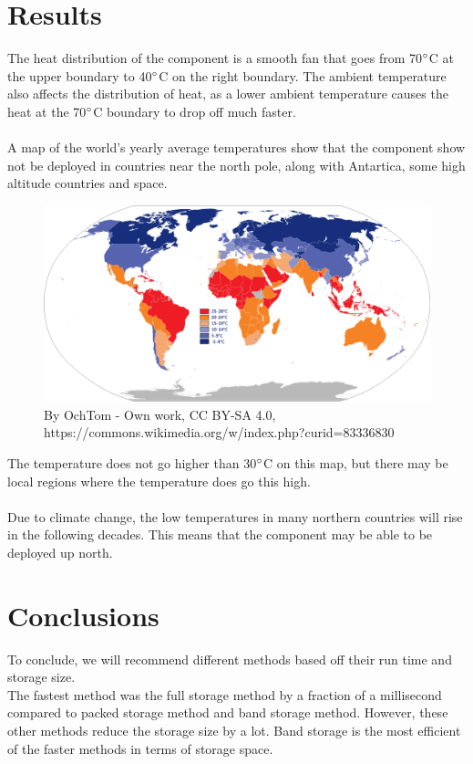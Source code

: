\documentclass[12pt,a4paper]{article}
\begin{document}
\section{Results}
The heat distribution of the component is a smooth fan that goes from 70$\degree$C at the upper boundary to 40$\degree$C on the right boundary. The ambient temperature also affects the distribution of heat, as a lower ambient temperature causes the heat at the 70$\degree$C boundary to drop off much faster. \\\\A map of the world's yearly average temperatures show that the component show not be deployed in countries near the north pole, along with Antartica, some high altitude countries and space. 
\begin{figure}[H]
	\center
	\includegraphics[width=0.9\linewidth]{images/Average_yearly_temperature_per_country.png}
	\caption{By OchTom - Own work, CC BY-SA 4.0, https://commons.wikimedia.org/w/index.php?curid=83336830}
\end{figure}
The temperature does not go higher than 30$\degree$C on this map, but there may be local regions where the temperature does go this high. 
\\\\
Due to climate change, the low temperatures in many northern countries will rise in the following decades. This means that the component may be able to be deployed up north. 
\section{Conclusions}
To conclude, we will recommend different methods based off their run time and storage size.\\The fastest method was the full storage method by a fraction of a millisecond compared to packed storage method and band storage method. However, these other methods reduce the storage size by a lot. Band storage is the most efficient of the faster methods in terms of storage space.
\pagebreak
\end{document}
